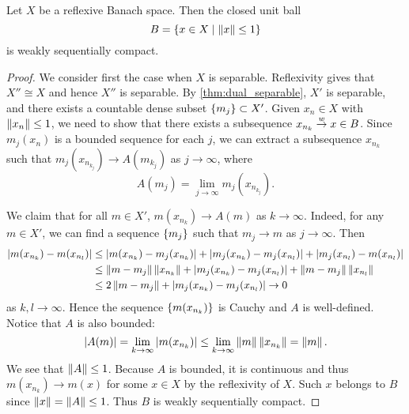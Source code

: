 \begin{theorem}[Kakutani]
    Let $X$ be a reflexive Banach space. Then the closed unit ball 
    \begin{equation*}
        B = \left\{ x\in X \;\middle\vert\; \left\lVert {x} \right\rVert\leq 1 \right\}
    \end{equation*}
    is weakly sequentially compact.
\end{theorem}
\begin{proof}
    We consider first the case when $X$ is separable. Reflexivity gives 
    that $X''\cong X$ and hence $X''$ is separable. By \cref{thm:dual_separable}, 
    $X'$ is separable, and there exists a countable dense subset 
    $\left\{ {m_j} \right\}\subset X'$. Given $x_n\in X$ with $\left\lVert {x_n} \right\rVert\leq 1$, we need 
    to show that there exists a subsequence $x_{n_k}\overset{w}{\to} x\in B$. Since $m_j(x_n)$ 
    is a bounded sequence for each $j$, we can extract a subsequence $x_{n_k}$ such that 
    $m_j(x_{n_{k_j}})\to A(m_{k_j})$ as $j\to\infty$, where 
    \begin{equation*}
        A(m_j) = \lim_{j\to\infty} m_j(x_{n_{k_j}}).
    \end{equation*}

    We claim that for all $m\in X'$, $m(x_{n_k})\to A(m)$ as $k\to\infty$. Indeed, 
    for any $m\in X'$, we can find a sequence $\left\{ {m_j} \right\}$ such that $m_j\to m$ as 
    $j\to\infty$. Then 
    \begin{equation*}
        \begin{split}
            \left\lvert {m(x_{n_k}) - m(x_{n_l})} \right\rvert 
            &\leq \left\lvert {m(x_{n_k}) - m_j(x_{n_k})} \right\rvert + \left\lvert {m_j(x_{n_k}) - m_j(x_{n_l})} \right\rvert + \left\lvert {m_j(x_{n_l}) - m(x_{n_l})} \right\rvert \\
            &\leq \left\lVert {m-m_j} \right\rVert\left\lVert {x_{n_k}} \right\rVert + \left\lvert {m_j(x_{n_k}) - m_j(x_{n_l})} \right\rvert + \left\lVert {m-m_j} \right\rVert\left\lVert {x_{n_l}} \right\rVert \\
            &\leq 2\left\lVert {m-m_j} \right\rVert + \left\lvert {m_j(x_{n_k}) - m_j(x_{n_l})} \right\rvert \to 0
        \end{split}
    \end{equation*}
    as $k,l\to\infty$. Hence the sequence $\left\{ {m(x_{n_k})} \right\}$ is Cauchy and $A$ 
    is well-defined. Notice that $A$ is also bounded:
    \begin{equation*}
        \left\lvert {A(m)} \right\rvert = \lim_{k\to\infty} \left\lvert {m(x_{n_k})} \right\rvert \leq \lim_{k\to\infty}\left\lVert {m} \right\rVert\left\lVert {x_{n_k}} \right\rVert = \left\lVert {m} \right\rVert.
    \end{equation*}
    We see that $\left\lVert {A} \right\rVert\leq 1$. Because $A$ is bounded, it is continuous and thus 
    $m(x_{n_k})\to m(x)$ for some $x\in X$ by the reflexivity of $X$. Such $x$ belongs 
    to $B$ since $\left\lVert {x} \right\rVert = \left\lVert {A} \right\rVert\leq 1$. Thus $B$ is weakly sequentially compact.


\end{proof}
